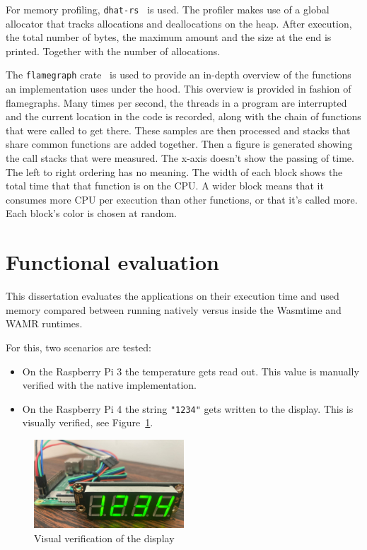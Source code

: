 For memory profiling, \texttt{dhat-rs}~\cite{gh:dhat} is used. The profiler makes use of a global allocator that tracks allocations and deallocations on the heap. After execution, the total number of bytes, the maximum amount and the size at the end is printed. Together with the number of allocations.

The \texttt{flamegraph} crate~\cite{gh:flamegraph} is used to provide an in-depth overview of the functions an implementation uses under the hood. This overview is provided in fashion of flamegraphs. Many times per second, the threads in a program are interrupted and the current location in the code is recorded, along with the chain of functions that were called to get there. These samples are then processed and stacks that share common functions are added together. Then a figure is generated showing the call stacks that were measured. The x-axis doesn't show the passing of time. The left to right ordering has no meaning. The width of each block shows the total time that that function is on the CPU. A wider block means that it consumes more CPU per execution than other functions, or that it's called more. Each block's color is chosen at random.

\section{Functional evaluation}

This dissertation evaluates the applications on their execution time and used memory compared between running natively versus inside the Wasmtime and \gls{WAMR} runtimes. 

For this, two scenarios are tested:

\begin{itemize}
  \item On the Raspberry Pi 3 the temperature gets read out. This value is manually verified with the native implementation.
  \item On the Raspberry Pi 4 the string \texttt{"1234"} gets written to the display. This is visually verified, see Figure~\ref{fig:verif}.
\end{itemize}

\begin{figure}[h]
  \centering
  \includegraphics[width=0.5\textwidth]{figures/verification}
  \caption{Visual verification of the display}
  \label{fig:verif}
\end{figure}

